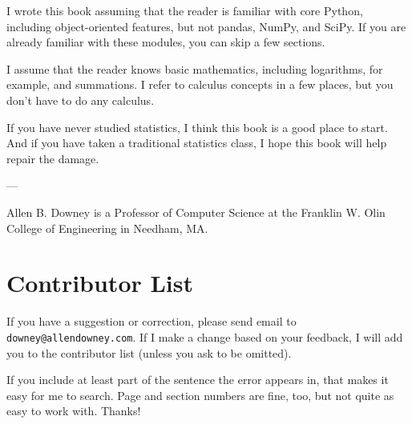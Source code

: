 \documentclass[12pt]{book}
\begin{document}
I wrote this book assuming that the reader is familiar with core Python,
including object-oriented features, but not pandas,
NumPy, and SciPy.  If you are already familiar with these modules, you
can skip a few sections.

I assume that the reader knows basic mathematics, including
logarithms, for example, and summations.  I refer to calculus concepts
in a few places, but you don't have to do any calculus.

If you have never studied statistics, I think this book is a good place
to start.  And if you have taken
a traditional statistics class, I hope this book will help repair the
damage.



---

Allen B. Downey is a Professor of Computer Science at 
the Franklin W. Olin College of Engineering in Needham, MA.




\section*{Contributor List}

If you have a suggestion or correction, please send email to 
{\tt downey@allendowney.com}.  If I make a change based on your
feedback, I will add you to the contributor list
(unless you ask to be omitted).

If you include at least part of the sentence the
error appears in, that makes it easy for me to search.  Page and
section numbers are fine, too, but not quite as easy to work with.
Thanks!

\small
\end{document}
